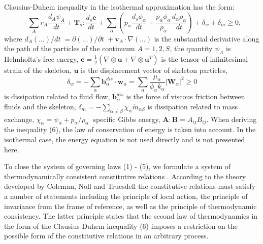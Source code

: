 \documentclass[article,authoryear,jpm]{beg_39}             %
\begin{document}
Clausius-Duhem inequality in the isothermal approximation has the form:
\begin{equation}
-\sum\limits_{A}{{{r}_{A}}\frac{{{d}_{A}}{{\psi }_{A}}}{dt}}+{{\mathbf{T}}_{s}}:\frac{{{d}_{s}}\mathbf{e}}{dt}+\sum\limits_{\alpha }{\left( {{p}_{\alpha }}\frac{{{d}_{s}}{{\phi }_{\alpha }}}{dt}+\frac{{{p}_{\alpha }}{{\phi }_{\alpha }}}{{{\rho }_{\alpha }}}\frac{{{d}_{\alpha }}{{\rho }_{\alpha }}}{dt} \right)}+{{\delta }_{w}}+{{\delta }_{m}}\ge 0,
\end{equation}
where ${{{d}_{A}}\left( ... \right)}/{dt}\;={\partial \left( ... \right)}/{\partial t}\;+{{\mathbf{v}}_{A}}\cdot \nabla (...)$ is the substantial derivative along the path of the particles of the continuum $A=1,2,S$, the quantity ${{\psi }_{A}}$ is Helmholtz’s free energy, $\mathbf{e}=\frac{1}{2}\left( \nabla \otimes \mathbf{u}+\nabla \otimes {{\mathbf{u}}^{T}} \right)$ is the tensor of infinitesimal strain of the skeleton, $\mathbf{u}$ is the displacement vector of skeleton particles, $${{\delta }_{w}}=-\sum\limits_{\alpha }{\mathbf{b}_{\alpha }^{dis}}\cdot {{\mathbf{w}}_{\alpha }}=\sum\limits_{\alpha }{\frac{{{\mu }_{\alpha }}}{{{\phi }_{\alpha }}{{k}_{\alpha }}}{{\left| {{\mathbf{W}}_{\alpha }} \right|}^{2}}}\ge 0$$ is dissipation related to fluid flow, $\mathbf{b}_{\alpha }^{dis}$ is the force of viscous friction between fluids and the skeleton, ${{\delta }_{m}}=-\sum\limits_{\alpha \ne \beta }{{{\chi }_{\alpha }}{{{\dot{m}}}_{\alpha \beta }}}$ is dissipation related to mass exchange, ${{\chi }_{\alpha }}={{\psi }_{\alpha }}+{{{p}_{\alpha }}}/{{{\rho }_{\alpha }}}\;$ specific Gibbs energy, $\mathbf{A}:\mathbf{B}={{A}_{ij}}{{B}_{ij}}$.
When deriving the inequality (6), the law of conservation of energy is taken into account.
In the isothermal case, the energy equation is not used directly and is not presented here.

To close the system of governing laws (1) - (5), we formulate a system of thermodynamically consistent constitutive relations \cite{Truesdell}.
According to the theory developed by Coleman, Noll and Truesdell the constitutive relations must satisfy a number of statements including the principle of local action, the principle of invariance from the frame of reference, as well as the principle of thermodynamic consistency.
The latter principle states that the second law of thermodynamics in the form of the Clausius-Duhem inequality (6) imposes a restriction on the possible form of the constitutive relations in an arbitrary process.
\end{document}
